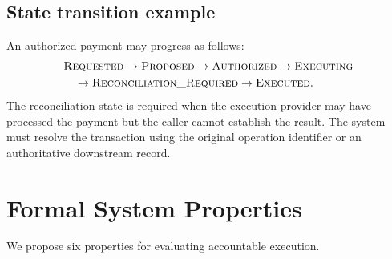 \documentclass[11pt,a4paper]{article}
\begin{document}
\subsection{State transition example}

An authorized payment may progress as follows:
\begin{align*}
&\textsc{Requested} \rightarrow \textsc{Proposed} \rightarrow \textsc{Authorized} \rightarrow \textsc{Executing} \\
&\quad\rightarrow \textsc{Reconciliation\_Required} \rightarrow \textsc{Executed}.
\end{align*}
The reconciliation state is required when the execution provider may have processed the payment but the caller cannot establish the result. The system must resolve the transaction using the original operation identifier or an authoritative downstream record.

\section{Formal System Properties}

We propose six properties for evaluating accountable execution.
\end{document}
